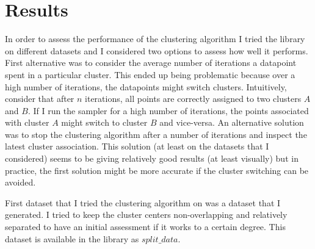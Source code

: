 \documentclass[12pt,a4paper]{article}
\begin{document}
\section{Results}
In order to assess the performance of the clustering algorithm I tried the library on different datasets and I considered two options to assess how well it performs. First alternative was to consider the average number of iterations a datapoint spent in a particular cluster. This ended up being problematic because over a high number of iterations, the datapoints might switch clusters. Intuitively, consider that after $n$ iterations, all points are correctly assigned to two clusters $A$ and $B$. If I run the sampler for a high number of iterations, the points associated with cluster $A$ might switch to cluster $B$ and vice-versa. An alternative solution was to stop the clustering algorithm after a number of iterations and inspect the latest cluster association. This solution (at least on the datasets that I considered) seems to be giving relatively good results (at least visually) but in practice, the first solution might be more accurate if the cluster switching can be avoided.

First dataset that I tried the clustering algorithm on was a dataset that I generated. I tried to keep the cluster centers non-overlapping and relatively separated to have an initial assessment if it works to a certain degree. This dataset is available in the library as $split\_data$.
\end{document}
